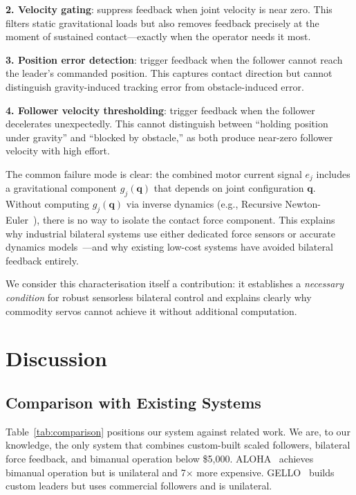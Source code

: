 \documentclass[conference]{IEEEtran}
\begin{document}
\textbf{2. Velocity gating}: suppress feedback when joint velocity is near zero. This filters static gravitational loads but also removes feedback precisely at the moment of sustained contact---exactly when the operator needs it most.

\textbf{3. Position error detection}: trigger feedback when the follower cannot reach the leader's commanded position. This captures contact direction but cannot distinguish gravity-induced tracking error from obstacle-induced error.

\textbf{4. Follower velocity thresholding}: trigger feedback when the follower decelerates unexpectedly. This cannot distinguish between ``holding position under gravity'' and ``blocked by obstacle,'' as both produce near-zero follower velocity with high effort.

The common failure mode is clear: the combined motor current signal $e_j$ includes a gravitational component $g_j(\mathbf{q})$ that depends on joint configuration $\mathbf{q}$. Without computing $g_j(\mathbf{q})$ via inverse dynamics (e.g., Recursive Newton-Euler~\cite{lynch2017modern}), there is no way to isolate the contact force component. This explains why industrial bilateral systems use either dedicated force sensors or accurate dynamics models~\cite{fast_bilateral2025}---and why existing low-cost systems have avoided bilateral feedback entirely.

We consider this characterisation itself a contribution: it establishes a \emph{necessary condition} for robust sensorless bilateral control and explains clearly why commodity servos cannot achieve it without additional computation.

\section{Discussion}

\subsection{Comparison with Existing Systems}

Table~\ref{tab:comparison} positions our system against related work. We are, to our knowledge, the only system that combines custom-built scaled followers, bilateral force feedback, and bimanual operation below \$5,000. ALOHA~\cite{zhao2023aloha} achieves bimanual operation but is unilateral and 7$\times$ more expensive. GELLO~\cite{wu_2024_gello} builds custom leaders but uses commercial followers and is unilateral.
\end{document}
